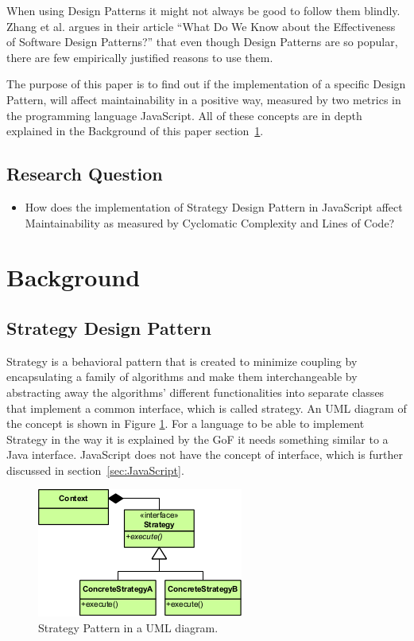 \documentclass[conference, a4paper]{IEEEtran}
\begin{document}
When using Design Patterns it might not always be good to follow them blindly. Zhang et al. argues in their article ``What Do We Know about the Effectiveness of Software Design Patterns?'' that even though Design Patterns are so popular, there are few empirically justified reasons to use them.~\cite{bibitem:Zhang}

The purpose of this paper is to find out if the implementation of a specific Design Pattern, will affect maintainability in a positive way, measured by two metrics in the programming language JavaScript. All of these concepts are in depth explained in the Background of this paper section~\ref{sec:Background}.

\subsection{Research Question}
\begin{itemize}
	\item How does the implementation of Strategy Design Pattern in JavaScript affect Maintainability as measured by Cyclomatic Complexity and Lines of Code?
\end{itemize}

\section{Background}
\label{sec:Background}

\subsection{Strategy Design Pattern}
\label{sec:Strategy}

Strategy is a behavioral pattern that is created to minimize coupling by encapsulating a family of algorithms and make them interchangeable by abstracting away the algorithms' different functionalities into separate classes that implement a common interface, which is called strategy. An UML diagram of the concept is shown in Figure \ref{fig:Strategy}. For a language to be able to implement Strategy in the way it is explained by the GoF it needs something similar to a Java interface. JavaScript does not have the concept of interface, which is further discussed in section~\ref{sec:JavaScript}.~\cite{bibitem:GoF}

\begin{figure}[ht!]
	\centering
	\includegraphics[scale=0.7]{Strategy_Pattern_in_UML.png}
	\caption{Strategy Pattern in a UML diagram.}
	\label{fig:Strategy}
\end{figure}
\end{document}
